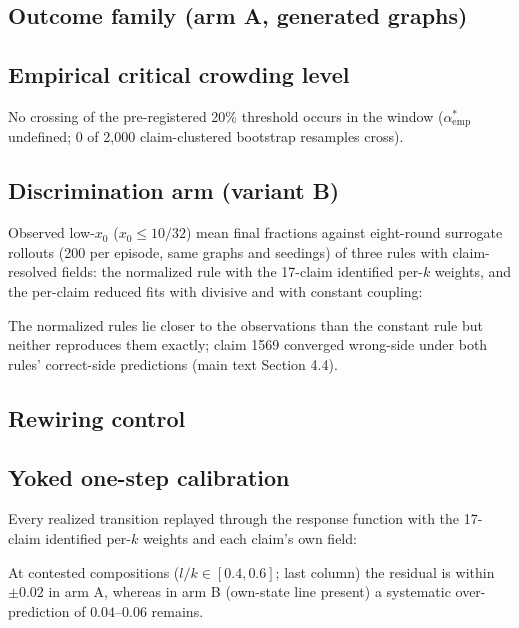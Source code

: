 \documentclass[11pt]{article}
\newcommand{\astar}{\alpha^{*}}
\begin{document}
\subsection{Outcome family (arm A, generated graphs)}
\begin{center}
\small

\end{center}

\subsection{Empirical critical crowding level}
\begin{center}

\end{center}
No crossing of the pre-registered 20\% threshold occurs in the window
($\astar_{\mathrm{emp}}$ undefined; 0 of 2{,}000 claim-clustered bootstrap
resamples cross).

\subsection{Discrimination arm (variant B)}
\begin{center}

\end{center}

Observed low-$x_0$ ($x_0 \le 10/32$) mean final fractions against eight-round
surrogate rollouts (200 per episode, same graphs and seedings) of three rules
with claim-resolved fields: the normalized rule with the 17-claim identified
per-$k$ weights, and the per-claim reduced fits with divisive and with
constant coupling:
\begin{center}
\small
\resizebox{\textwidth}{!}{}
\end{center}
The normalized rules lie closer to the observations than the constant rule
but neither reproduces them exactly; claim 1569 converged wrong-side under
both rules' correct-side predictions (main text Section 4.4).

\subsection{Rewiring control}
\begin{center}

\end{center}

\subsection{Yoked one-step calibration}
Every realized transition replayed through the response function with the
17-claim identified per-$k$ weights and each claim's own field:
\begin{center}
\small

\end{center}
At contested compositions ($l/k \in [0.4, 0.6]$; last column) the residual
is within $\pm 0.02$ in arm A, whereas in arm B (own-state line present) a
systematic over-prediction of $0.04$--$0.06$ remains.
\end{document}
